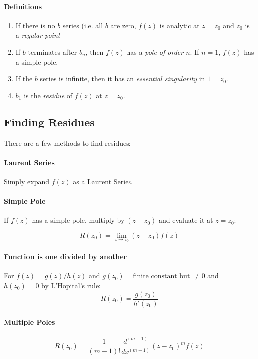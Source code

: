 \documentclass[12pt]{article}
\begin{document}
\paragraph{Definitions}
\begin{enumerate}
    \item If there is no $b$ series (i.e. all $b$ are zero, $f(z)$ is analytic at $z=z_0$ and $z_0$ is a \textit{regular point}
    \item If $b$ terminates after $b_n$, then $f(z)$ has a \textit{pole of order $n$}. If $n=1$, $f(z)$ has a simple pole.
    \item If the $b$ series is infinite, then it has an \textit{essential singularity} in $1=z_0$.
    \item $b_1$ is the \textit{residue} of $f(z)$ at $z=z_0$.
\end{enumerate}

\subsection{Finding Residues}
There are a few methods to find residues:

\paragraph{Laurent Series}
Simply expand $f(z)$ as a Laurent Series.

\paragraph{Simple Pole}
If $f(z)$ has a simple pole, multiply by $(z-z_0)$ and evaluate it at $z=z_0$:

\[R(z_0) =\lim_{z\to z_0} (z-z_0)f(z)\]

\paragraph{Function is one divided by another}

For $f(z) = g(z)/h(z)$ and $g(z_0) = \text{finite constant}$ but $\neq 0$ and $h(z_0) = 0$ by L'Hopital's rule:
\[ R(z_0) = \frac{g(z_0)}{h'(z_0)}\]

\paragraph{Multiple Poles}

\[R(z_0) = \frac{1}{(m-1)!}\frac{d^{(m-1)}}{dx^{(m-1)}}(z-z_0)^mf(z)\]
\end{document}

